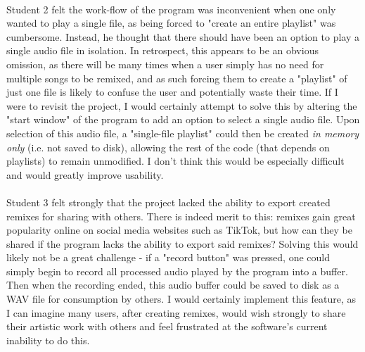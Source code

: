 \paragraph{}
Student 2 felt the work-flow of the program was inconvenient when one only wanted to play a single file, as being forced to "create an entire playlist" was cumbersome.  Instead, he thought that there should have been an option to play a single audio file in isolation. In retrospect, this appears to be an obvious omission, as there will be many times when a user simply has no need for multiple songs to be remixed, and as such forcing them to create a "playlist" of just one file is likely to confuse the user and potentially waste their time. If I were to revisit the project, I would certainly attempt to solve this by altering the "start window" of the program to add an option to select a single audio file. Upon selection of this audio file, a "single-file playlist" could then be created \textit{in memory only} (i.e. not saved to disk), allowing the rest of the code (that depends on playlists) to remain unmodified. I don't think this would be especially difficult and would greatly improve usability.

\paragraph{}
Student 3 felt strongly that the project lacked the ability to export created remixes for sharing with others. There is indeed merit to this: remixes gain great popularity online on social media websites such as TikTok, but how can they be shared if the program lacks the ability to export said remixes? Solving this would likely not be a great challenge - if a "record button" was pressed, one could simply begin to record all processed audio played by the program into a buffer. Then when the recording ended, this audio buffer could be saved to disk as a WAV file for consumption by others. I would certainly implement this feature, as I can imagine many users, after creating remixes, would wish strongly to share their artistic work with others and feel frustrated at the software's current inability to do this.

